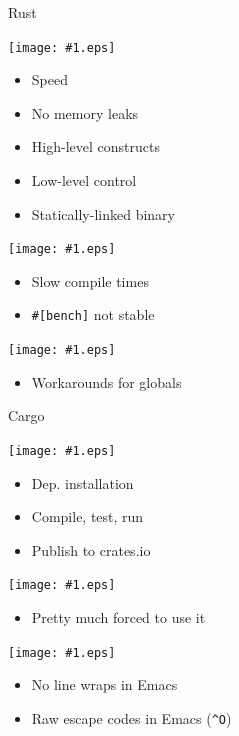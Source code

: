 \documentclass{beamer}
\renewcommand\big[1]{
  \begin{center}
    \Huge{#1}
  \end{center}
}
\def\MinipageWidth{.32\textwidth}
\newcommand\SmileyBlock[2]{
  \begin{minipage}[t]{\MinipageWidth}
    \begin{center}
      \texttt{[image: \#1.eps]}
    \end{center}
    \scriptsize
    #2
  \end{minipage}
}
\begin{document}
\begin{frame}[t,fragile]
  \big{Rust}\pause

  \SmileyBlock{good}{
    \begin{itemize}
      \item Speed
      \item No memory leaks
      \item High-level constructs
      \item Low-level control
      \item Statically-linked binary
    \end{itemize}
  }\pause
  \SmileyBlock{bad}{
    \begin{itemize}
      \item Slow compile times
      \item \texttt{\#[bench]} not stable
    \end{itemize}
  }\pause
  \SmileyBlock{ugly}{
    \begin{itemize}
      \item Workarounds for globals
    \end{itemize}
  }
\end{frame}

\begin{frame}[t,fragile]
  \big{Cargo}\pause

  \SmileyBlock{good}{
    \begin{itemize}
      \item Dep. installation
      \item Compile, test, run
      \item Publish to crates.io
    \end{itemize}
  }\pause
  \SmileyBlock{bad}{
    \begin{itemize}
      \item Pretty much forced to use it
    \end{itemize}
  }\pause
  \SmileyBlock{ugly}{
    \begin{itemize}
      \item No line wraps in Emacs
      \item Raw escape codes in Emacs (\texttt{\^{}O})
    \end{itemize}
  }
\end{frame}
\end{document}
